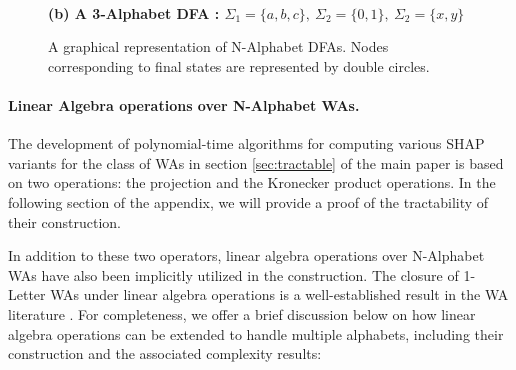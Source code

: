 \begin{figure}
\begin{minipage}[t]{0.3\linewidth}
 \\
         \textbf{(b) A 3-Alphabet DFA : $\Sigma_{1} = \{a,b,c\},~\Sigma_{2} = \{0,1\},~\Sigma_{2} = \{x,y\}$}
    \end{minipage}
    \caption{A graphical representation of N-Alphabet DFAs. Nodes corresponding to final states are represented by double circles.}
  \label{app:fig:nalphabetdfa}
\end{figure}
 
 \paragraph{Linear Algebra operations over N-Alphabet WAs.} 
 The development of polynomial-time algorithms for computing various SHAP variants for the class of WAs in section \ref{sec:tractable} of the main paper is based on two operations: the projection and the Kronecker product operations. In the following section of the appendix, we will provide a proof of the tractability of their construction.
 

In addition to these two operators, linear algebra operations over N-Alphabet WAs have also been implicitly utilized in the construction. The closure of 1-Letter WAs under linear algebra operations is a well-established result in the WA literature \citep{droste10}. For completeness, we offer a brief discussion below on how linear algebra operations can be extended to handle multiple alphabets, including their construction and the associated complexity results:

